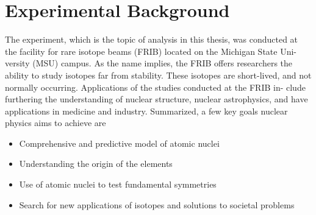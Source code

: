 \section{Experimental Background}
The experiment, which is the topic of analysis in this thesis, was conducted at
the facility for rare isotope beams (FRIB) located on the Michigan State Uni-
versity (MSU) campus. As the name implies, the FRIB offers researchers the
ability to study isotopes far from stability. These isotopes are short-lived, and
not normally occurring. Applications of the studies conducted at the FRIB in-
clude furthering the understanding of nuclear structure, nuclear astrophysics,
and have applications in medicine and industry. Summarized, a few key goals nuclear 
physics aims to achieve are
\begin{itemize}
	\item Comprehensive and predictive model of atomic nuclei
	\item Understanding the origin of the elements
	\item Use of atomic nuclei to test fundamental symmetries
	\item Search for new applications of isotopes and solutions to societal problems
\end{itemize}

